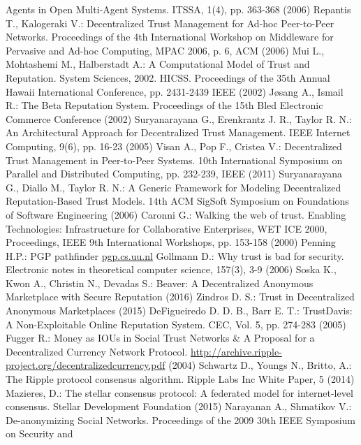 \begin{thebibliography}{40}
  Agents in Open Multi-Agent Systems. ITSSA, 1(4), pp. 363-368 (2006)
  Repantis T., Kalogeraki V.: Decentralized Trust Management for Ad-hoc Peer-to-Peer Networks. Proceedings of the 4th
  International Workshop on Middleware for Pervasive and Ad-hoc Computing, MPAC 2006, p. 6, ACM (2006)
  Mui L., Mohtashemi M., Halberstadt A.: A Computational Model of Trust and Reputation. System Sciences, 2002. HICSS.
  Proceedings of the 35th Annual Hawaii International Conference, pp. 2431-2439 IEEE (2002)
  J\o{}sang A., Ismail R.: The Beta Reputation System. Proceedings of the 15th Bled Electronic Commerce Conference (2002)
  Suryanarayana G., Erenkrantz J. R., Taylor R. N.: An Architectural Approach for Decentralized Trust Management. IEEE
  Internet Computing, 9(6), pp. 16-23 (2005)
  Visan A., Pop F., Cristea V.: Decentralized Trust Management in Peer-to-Peer Systems. 10th International Symposium on
  Parallel and Distributed Computing, pp. 232-239, IEEE (2011)
  Suryanarayana G., Diallo M., Taylor R. N.: A Generic Framework for Modeling Decentralized Reputation-Based Trust Models.
  14th ACM SigSoft Symposium on Foundations of Software Engineering (2006)
  Caronni G.: Walking the web of trust. Enabling Technologies: Infrastructure for Collaborative Enterprises, WET ICE 2000,
  Proceedings, IEEE 9th International Workshops, pp. 153-158 (2000)
  Penning H.P.: PGP pathfinder \url{pgp.cs.uu.nl}
  Gollmann D.: Why trust is bad for security. Electronic notes in theoretical computer science, 157(3), 3-9 (2006)
  Soska K., Kwon A., Christin N., Devadas S.: Beaver: A Decentralized Anonymous Marketplace with Secure Reputation (2016)
  Zindros D. S.: Trust in Decentralized Anonymous Marketplaces (2015)
  DeFigueiredo D. D. B., Barr E. T.: TrustDavis: A Non-Exploitable Online Reputation System. CEC, Vol. 5, pp. 274-283
  (2005)
  Fugger R.: Money as IOUs in Social Trust Networks \& A Proposal for a Decentralized Currency Network Protocol.
  \url{http://archive.ripple-project.org/decentralizedcurrency.pdf} (2004)
  Schwartz D., Youngs N., Britto, A.: The Ripple protocol consensus algorithm. Ripple Labs Inc White Paper, 5 (2014)
  Mazieres, D.: The stellar consensus protocol: A federated model for internet-level consensus. Stellar Development
  Foundation (2015)
  Narayanan A., Shmatikov V.: De-anonymizing Social Networks. Proceedings of the 2009 30th IEEE Symposium on Security and

\end{thebibliography}
